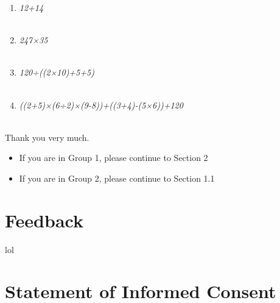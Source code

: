 \documentclass[14pt]{article}
\begin{document}
\begin{enumerate}
\item \emph{12+14}\\

\fbox{
\begin{minipage}{16cm}
\hfill\vspace{3cm}
\end{minipage}
}\\

\item \emph{247×35}\\

\fbox{
\begin{minipage}{16cm}
\hfill\vspace{3cm}
\end{minipage}
}\\

\item \emph{120÷((2×10)+5+5)}\\

\fbox{
\begin{minipage}{16cm}
\hfill\vspace{3cm}
\end{minipage}
}\\

\item \emph{((2+5)×(6÷2)×(9-8))+((3+4)-(5×6))+120}\\

\fbox{
\begin{minipage}{16cm}
\hfill\vspace{3cm}
\end{minipage}
}\\

\end{enumerate}

Thank you very much.

\begin{itemize}
\item If you are in Group 1, please continue to Section 2
\item If you are in Group 2, please continue to Section 1.1
\end{itemize}

\section{Feedback}

lol

\section{Statement of Informed Consent}
\end{document}
